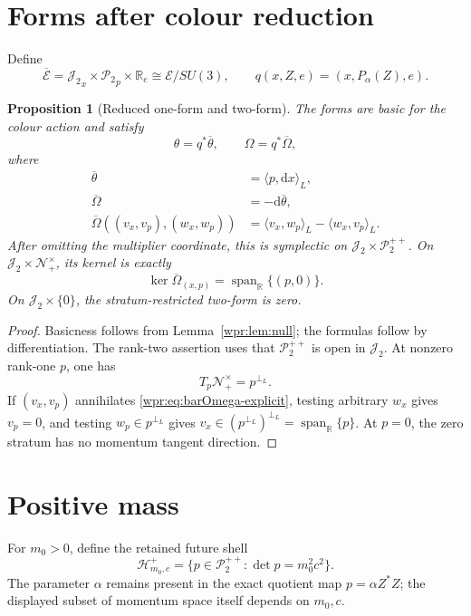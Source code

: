 \documentclass[11pt]{article}
\newtheorem{proposition}[theorem]{Proposition}
\newcommand{\J}{\mathcal J_2}
\newcommand{\Psd}{\mathcal P_2}
\newcommand{\Ppos}{\mathcal P_2^{++}}
\newcommand{\Nfuture}{\mathcal N_+^\times}
\newcommand{\dd}{\mathrm d}
\newcommand{\SpanR}{\operatorname{span}_{\mathbb R}}
\begin{document}
\section{Forms after colour reduction}
Define
\[
 \overline{\mathcal E}
 ={\J}_x\times{\Psd}_p\times\mathbb R_e
 \cong\mathcal E/SU(3),\qquad
 q(x,Z,e)=(x,P_\alpha(Z),e).
\]

\begin{proposition}[Reduced one-form and two-form]
\label{wpr:prop:reduced-forms}
The forms are basic for the colour action and satisfy
\[
 \theta=q^*\overline\theta,\qquad
 \Omega=q^*\overline\Omega,
\]
where
\begin{align}
 \overline\theta&=\langle p,\dd x\rangle_L,\label{wpr:eq:bartheta}\\
 \overline\Omega&=-\dd\overline\theta,\label{wpr:eq:barOmega}\\
 \overline\Omega((v_x,v_p),(w_x,w_p))
 &=\langle v_x,w_p\rangle_L-\langle w_x,v_p\rangle_L.
 \label{wpr:eq:barOmega-explicit}
\end{align}
After omitting the multiplier coordinate, this is symplectic on
\(\J\times\Ppos\).  On \(\J\times\Nfuture\), its kernel is exactly
\[
 \ker\overline\Omega_{(x,p)}=\SpanR\{(p,0)\}.
\]
On \(\J\times\{0\}\), the stratum-restricted two-form is zero.
\end{proposition}
\begin{proof}
Basicness follows from Lemma~\ref{wpr:lem:null}; the formulas follow by
differentiation.  The rank-two assertion uses that \(\Ppos\) is open in
\(\J\).  At nonzero rank-one \(p\), one has
\[
 T_p\Nfuture=p^{\perp_L}.
\]
If \((v_x,v_p)\) annihilates \eqref{wpr:eq:barOmega-explicit}, testing
arbitrary \(w_x\) gives \(v_p=0\), and testing
\(w_p\in p^{\perp_L}\) gives
\(v_x\in(p^{\perp_L})^{\perp_L}=\SpanR\{p\}\).
At \(p=0\), the zero stratum has no momentum tangent direction.
\end{proof}

\section{Positive mass}
For \(m_0>0\), define the retained future shell
\[
 \mathcal H^+_{m_0,c}
 =\{p\in\Ppos:\det p=m_0^2c^2\}.
\]
The parameter \(\alpha\) remains present in the exact quotient map
\(p=\alpha Z^*Z\); the displayed subset of momentum space itself
depends on \(m_0,c\).
\end{document}
